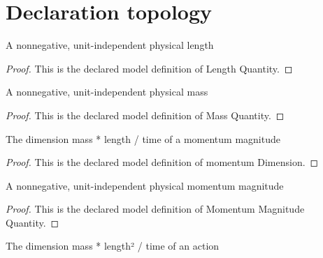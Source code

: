 \section{Declaration topology}
\begin{definition}
  \label{def:physics:phyx-mini-0623:phyxminiproblems-problemphyxmini0623-lengthquantity}
  A nonnegative, unit-independent physical length
\end{definition}
\begin{proof}
  This is the declared model definition of Length Quantity.
\end{proof}
\begin{definition}
  \label{def:physics:phyx-mini-0623:phyxminiproblems-problemphyxmini0623-massquantity}
  A nonnegative, unit-independent physical mass
\end{definition}
\begin{proof}
  This is the declared model definition of Mass Quantity.
\end{proof}
\begin{definition}
  \label{def:physics:phyx-mini-0623:phyxminiproblems-problemphyxmini0623-momentumdimension}
  The dimension mass * length / time of a momentum magnitude
\end{definition}
\begin{proof}
  This is the declared model definition of momentum Dimension.
\end{proof}
\begin{definition}
  \label{def:physics:phyx-mini-0623:phyxminiproblems-problemphyxmini0623-momentummagnitudequantity}
  A nonnegative, unit-independent physical momentum magnitude
\end{definition}
\begin{proof}
  This is the declared model definition of Momentum Magnitude Quantity.
\end{proof}
\begin{definition}
  \label{def:physics:phyx-mini-0623:phyxminiproblems-problemphyxmini0623-actiondimension}
  The dimension mass * length² / time of an action
\end{definition}
